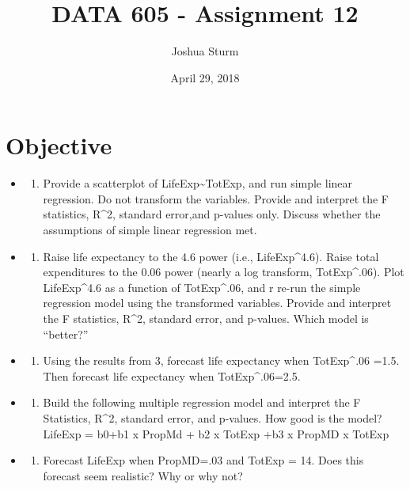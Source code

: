 \documentclass[]{article}
\title{DATA 605 - Assignment 12}
\author{Joshua Sturm}
\date{April 29, 2018}
\providecommand{\tightlist}{%
  \setlength{\itemsep}{0pt}\setlength{\parskip}{0pt}}
\begin{document}
\maketitle

\section{Objective}\label{objective}

\begin{itemize}
\item
  \begin{enumerate}
  \def\labelenumi{\arabic{enumi}.}
  \tightlist
  \item
    Provide a scatterplot of LifeExp\textasciitilde{}TotExp, and run
    simple linear regression. Do not transform the variables. Provide
    and interpret the F statistics, R\^{}2, standard error,and p-values
    only. Discuss whether the assumptions of simple linear regression
    met.
  \end{enumerate}
\item
  \begin{enumerate}
  \def\labelenumi{\arabic{enumi}.}
  \setcounter{enumi}{1}
  \tightlist
  \item
    Raise life expectancy to the 4.6 power (i.e., LifeExp\^{}4.6). Raise
    total expenditures to the 0.06 power (nearly a log transform,
    TotExp\^{}.06). Plot LifeExp\^{}4.6 as a function of TotExp\^{}.06,
    and r re-run the simple regression model using the transformed
    variables. Provide and interpret the F statistics, R\^{}2, standard
    error, and p-values. Which model is ``better?''
  \end{enumerate}
\item
  \begin{enumerate}
  \def\labelenumi{\arabic{enumi}.}
  \setcounter{enumi}{2}
  \tightlist
  \item
    Using the results from 3, forecast life expectancy when
    TotExp\^{}.06 =1.5. Then forecast life expectancy when
    TotExp\^{}.06=2.5.
  \end{enumerate}
\item
  \begin{enumerate}
  \def\labelenumi{\arabic{enumi}.}
  \setcounter{enumi}{3}
  \tightlist
  \item
    Build the following multiple regression model and interpret the F
    Statistics, R\^{}2, standard error, and p-values. How good is the
    model?\\
    LifeExp = b0+b1 x PropMd + b2 x TotExp +b3 x PropMD x TotExp
  \end{enumerate}
\item
  \begin{enumerate}
  \def\labelenumi{\arabic{enumi}.}
  \setcounter{enumi}{4}
  \tightlist
  \item
    Forecast LifeExp when PropMD=.03 and TotExp = 14. Does this forecast
    seem realistic? Why or why not?
  \end{enumerate}
\end{itemize}
\end{document}
